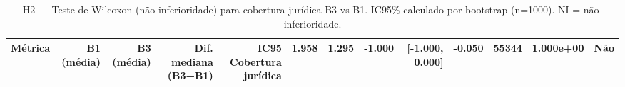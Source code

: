 \begin{table}[htbp]
\centering
\caption{H2 — Teste de Wilcoxon (não-inferioridade) para cobertura jurídica B3 vs B1. IC95\% calculado por bootstrap (n=1000). NI = não-inferioridade.}
\label{tab:t5_h2_wilcoxon}
\small
\begin{tabular}{lrrrrrrrr}
\toprule
Métrica & B1 (média) & B3 (média) & Dif. mediana (B3−B1) & IC95%
\midrule
Cobertura jurídica & 1.958 & 1.295 & -1.000 & [-1.000, 0.000] & -0.050 & 55344 & 1.000e+00 & Não \\
\bottomrule
\end{tabular}
\end{table}
